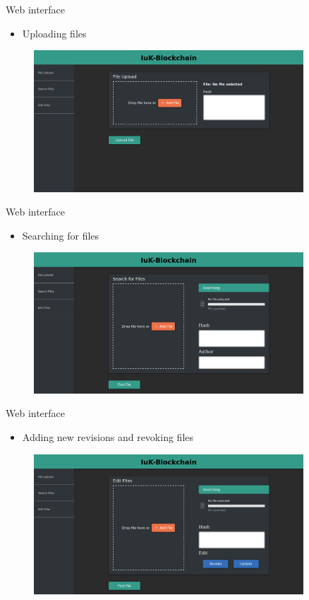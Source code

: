 \documentclass[10pt]{beamer}
\begin{document}
\begin{frame}{Web interface}
	\begin{itemize}
		\item Uploading files
	\end{itemize}
	\begin{figure}
		\includegraphics[width=0.9\textwidth]{images/upload.png}
	\end{figure}
\end{frame}

\begin{frame}{Web interface}
	\begin{itemize}
		\item Searching for files
	\end{itemize}
	\begin{figure}
		\includegraphics[width=0.9\textwidth]{images/search.png}
	\end{figure}
\end{frame}

\begin{frame}{Web interface}
	\begin{itemize}
		\item Adding new revisions and revoking files
	\end{itemize}
	\begin{figure}
		\includegraphics[width=0.9\textwidth]{images/edit.png}
	\end{figure}
\end{frame}
\end{document}

